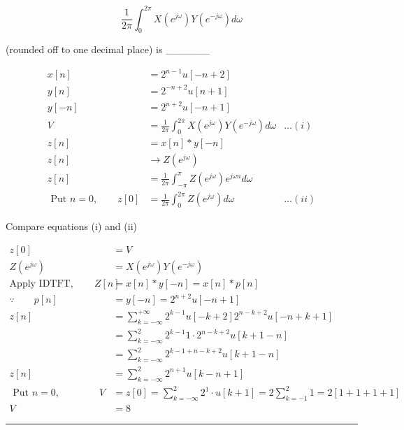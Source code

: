 \documentclass[11pt,a4paper]{article}
\begin{document}
\[
\frac{1}{2\pi } \int_{0}^{2\pi }X\left ( e^{j\omega } \right )Y\left ( e^{-j\omega } \right )d\omega
\]

(rounded off to one decimal place) is \_\_\_\_\_\_


\begin{tcolorbox}[solbox, title=Detailed Solution -- Question 35]
\[
\begin{aligned} x[n] &=2^{n-1} u[-n+2] \\ y[n] &=2^{-n+2} u[n+1] \\ y[-n] &=2^{n+2} u[-n+1] \\ V &=\frac{1}{2 \pi} \int_{0}^{2 \pi} X\left(e^{j \omega}\right) Y\left(e^{-j \omega}\right) d \omega &\ldots(i)\\ z[n] &=x[n] * y[-n] \\ z[n] & \rightarrow Z\left(e^{j \omega}\right) \\ z[n] &=\frac{1}{2 \pi} \int_{-\pi}^{\pi} Z\left(e^{j \omega}\right) e^{j \omega n} d \omega \\ \text { Put } n=0, \qquad z[0] &=\frac{1}{2 \pi} \int_{0}^{2 \pi} Z\left(e^{j \omega}\right) d \omega &\ldots(ii) \end{aligned}
\]

Compare equations (i) and (ii)

\[
\begin{aligned} z[0] &=V \\ Z\left(e^{j \omega}\right) &=X\left(e^{j \omega}\right) Y\left(e^{-j \omega}\right) \\ \text{Apply IDTFT},\qquad Z[n] &=x[n] * y[-n]=x[n] * p[n]\\ \because \qquad p[n]&=y[-n]=2^{n+2} u[-n+1]\\ z[n] &=\sum_{k=-\infty}^{+\infty} 2^{k-1} u[-k+2] 2^{n-k+2} u[-n+k+1] \\ &=\sum_{k=-\infty}^{2} 2^{k-1} 1 \cdot 2^{n-k+2} u[k+1-n] \\ &=\sum_{k=-\infty}^{2} 2^{k-1+n-k+2} u[k+1-n] \\ z[n] &=\sum_{k=-\infty}^{2} 2^{n+1} u[k-n+1] \\ \text { Put } n=0,\qquad \qquad V &=z[0]=\sum_{k=-\infty}^{2} 2^{1} \cdot u[k+1]=2 \sum_{k=-1}^{2} 1=2[1+1+1+1] \\ V &=8 \end{aligned}
\]
\end{tcolorbox}

\vspace{1.5em}
\hrule
\vspace{1.5em}
\end{document}
